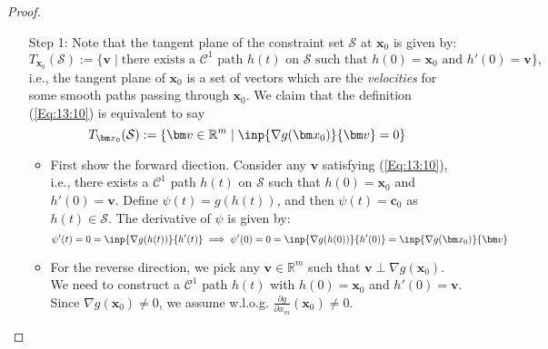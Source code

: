 \begin{proof}\qquad\\
\begin{enumerate}
\item[Step 1:]
Note that the tangent plane of the constraint set $\mathcal{S}$ at $\bm x_0$ is given by:
\begin{equation}\label{Eq:13:10}
T_{\bm x_0}(\mathcal{S}):=\{\bm v\mid \text{there exists a $\mathcal{C}^1$ path $h(t)$ on $\mathcal{S}$ such that $h(0)=\bm x_0$ and $h'(0)=\bm v$}\},
\end{equation}
i.e., the tangent plane of $\bm x_0$ is a set of vectors which are the \emph{velocities} for some smooth paths passing through $\bm x_0$. We claim that the definition (\ref{Eq:13:10}) is equivalent to say
\begin{equation}\label{Eq:13:11}
T_{\bm x_0}(\mathcal{S}):=\{\bm v\in\mathbb{R}^m\mid \inp{\nabla g(\bm x_0)}{\bm v}=0\}
\end{equation}
\begin{itemize}
\item
First show the forward diection. Consider any $\bm v$ satisfying (\ref{Eq:13:10}), i.e., there exists a $\mathcal{C}^1$ path $h(t)$ on $\mathcal{S}$ such that $h(0)=\bm x_0$ and $h'(0)=\bm v$. Define $\psi(t)=g(h(t))$, and then $\psi(t)=\bm c_0$ as $h(t)\in\mathcal{S}$. The derivative of $\psi$ is given by:
\[
\psi'(t)=0=\inp{\nabla g(h(t))}{h'(t)}\implies
\psi'(0)=0=\inp{\nabla g(h(0))}{h'(0)}=\inp{\nabla g(\bm x_0)}{\bm v}
\]
\item
For the reverse direction, we pick any $\bm v\in\mathbb{R}^m$ such that $\bm v\perp\nabla g(\bm x_0)$. We need to construct a $\mathcal{C}^1$ path $h(t)$ with $h(0)=\bm x_0$ and $h'(0)=\bm v$.  Since $\nabla g(\bm x_0)\ne0$, we assume w.l.o.g. $\frac{\partial g}{\partial x_m}(\bm x_0)\ne0$.


\end{itemize}
\end{enumerate}
\end{proof}

